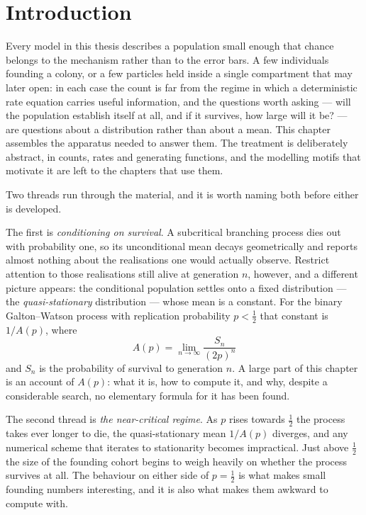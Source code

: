 \section{Introduction}
\label{sec:intro}

Every model in this thesis describes a population small enough that chance belongs to
the mechanism rather than to the error bars. A few individuals founding a colony, or a
few particles held inside a single compartment that may later open: in each case the
count is far from the regime in which a deterministic rate equation carries useful
information, and the questions worth asking --- will the population establish itself at
all, and if it survives, how large will it be? --- are questions about a distribution
rather than about a mean. This chapter assembles the apparatus needed to answer them.
The treatment is deliberately abstract, in counts, rates and generating functions, and
the modelling motifs that motivate it are left to the chapters that use them.

Two threads run through the material, and it is worth naming both before either is
developed.

The first is \emph{conditioning on survival}. A subcritical branching process dies out
with probability one, so its unconditional mean decays geometrically and reports almost
nothing about the realisations one would actually observe. Restrict attention to those
realisations still alive at generation $n$, however, and a different picture appears:
the conditional population settles onto a fixed distribution --- the
\emph{quasi-stationary} distribution --- whose mean is a constant. For the binary
Galton--Watson process with replication probability $p<\tfrac12$ that constant is
$1/A(p)$, where
\begin{equation*}
A(p) = \lim_{n\to\infty}\frac{S_n}{(2p)^n}
\end{equation*}
and $S_n$ is the probability of survival to generation $n$. A large part of this
chapter is an account of $A(p)$: what it is, how to compute it, and why, despite a
considerable search, no elementary formula for it has been found.

The second thread is \emph{the near-critical regime}. As $p$ rises towards $\tfrac12$
the process takes ever longer to die, the quasi-stationary mean $1/A(p)$ diverges, and
any numerical scheme that iterates to stationarity becomes impractical. Just above
$\tfrac12$ the size of the founding cohort begins to weigh heavily on whether the
process survives at all. The behaviour on either side of $p=\tfrac12$ is what makes
small founding numbers interesting, and it is also what makes them awkward to compute
with.

